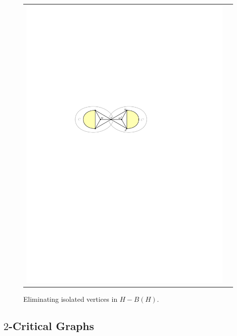 \documentclass[a4paper,UKenglish,cleveref, autoref, thm-restate]{lipics-v2021}
\begin{document}
\begin{figure}[htpb]
\begin{tabular}{cc}
    \includegraphics[page=4]{figs/isolated}
  \end{tabular}
  \caption{Eliminating isolated vertices in $H-B(H)$.}
  \label{isolated_fig}
\end{figure}





\subsection{$2$-Critical Graphs}
\label{two_critical_section}
\end{document}
